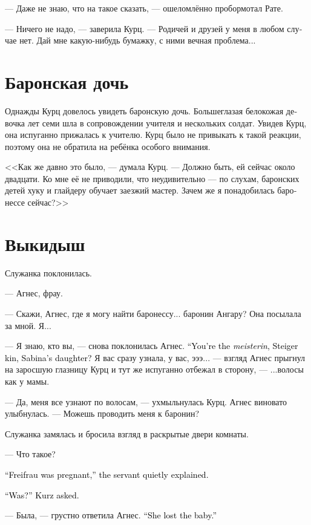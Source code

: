 \documentclass[a4paper,12pt,fleqn]{book}\usepackage{cooltooltips}\usepackage{polyglossia}\setdefaultlanguage[babelshorthands=true]{russian}\setotherlanguage{english}\defaultfontfeatures{Ligatures=TeX,Mapping=tex-text} \usepackage{xcolor}\definecolor{lightgray}{HTML}{bbbbbb}\color{lightgray}\newcommand{\ml}[3]{\textenglish{\textcolor{black}{#3}}}
\begin{document}
--- Даже не знаю, что на такое сказать, --- ошеломлённо пробормотал Рате.

--- Ничего не надо, --- заверила Курц.
--- Родичей и друзей у меня в любом случае нет.
Дай мне какую-нибудь бумажку, с ними вечная проблема...

\section{Баронская дочь}

Однажды Курц довелось увидеть баронскую дочь.
Большеглазая белокожая девочка лет семи шла в сопровождении учителя и нескольких солдат.
Увидев Курц, она испуганно прижалась к учителю.
Курц было не привыкать к такой реакции, поэтому она не обратила на ребёнка особого внимания.

<<Как же давно это было, --- думала Курц.
--- Должно быть, ей сейчас около двадцати.
Ко мне её не приводили, что неудивительно --- по слухам, баронских детей хуку и глайдеру обучает заезжий мастер.
Зачем же я понадобилась баронессе сейчас?>>

\section{Выкидыш}

Служанка поклонилась.

--- Агнес, фрау.

--- Скажи, Агнес, где я могу найти баронессу... баронин Ангару?
Она посылала за мной.
Я...

--- Я знаю, кто вы, --- снова поклонилась Агнес.
\ml{$0$}
{--- Вы майстерин из Штайгеров, дочь Сабины?}
{``You're the \textit{meisterin}, Steiger kin, Sabina's daughter?}
Я вас сразу узнала, у вас, эээ... --- взгляд Агнес прыгнул на заросшую глазницу Курц и тут же испуганно отбежал в сторону, --- ...волосы как у мамы.

--- Да, меня все узнают по волосам, --- ухмыльнулась Курц.
Агнес виновато улыбнулась.
--- Можешь проводить меня к баронин?

Служанка замялась и бросила взгляд в раскрытые двери комнаты.

--- Что такое?

\ml{$0$}
{--- Фрайфрау была беременна, --- шёпотом пояснила служанка.}
{``Freifrau was pregnant,'' the servant quietly explained.}

\ml{$0$}
{--- Была? --- уточнила Курц.}
{``Was?'' Kurz asked.}

--- Была, --- грустно ответила Агнес.
\ml{$0$}
{--- Выкидыш.}
{``She lost the baby.''}
\end{document}
